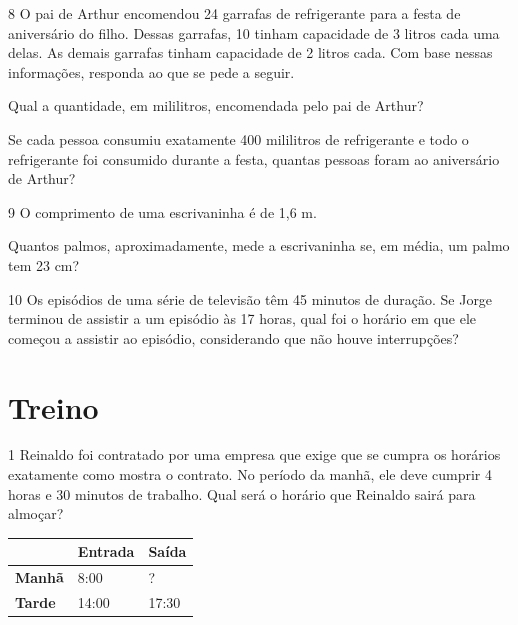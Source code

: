 \num{8} O pai de Arthur encomendou 24 garrafas de
refrigerante para a festa de aniversário do filho. Dessas garrafas, 10 tinham capacidade de 3 litros cada uma delas. As demais garrafas tinham capacidade de 2 litros cada. Com base nessas
informações, responda ao que se pede a seguir.

\begin{escolha}
\item Qual a quantidade, em mililitros, encomendada pelo pai de Arthur?

\item Se cada pessoa consumiu exatamente 400 mililitros de refrigerante e
  todo o refrigerante foi consumido durante a festa, quantas pessoas
  foram ao aniversário de Arthur?
\end{escolha}

\num{9} O comprimento de uma escrivaninha é de 1,6 m. 

\begin{escolha}
\item Quantos palmos,
aproximadamente, mede a escrivaninha se, em média, um palmo tem 23 cm?
\end{escolha}

\num{10} Os episódios de uma série de televisão têm 45 minutos de duração.
Se Jorge terminou de assistir a um episódio às 17 horas, qual foi o
horário em que ele começou a assistir ao episódio, considerando que não houve interrupções?
 
\pagebreak
\section*{Treino}

\num{1} Reinaldo foi contratado por uma empresa que exige que se cumpra os horários exatamente como mostra o contrato. No período da manhã, ele deve
cumprir 4 horas e 30 minutos de trabalho. Qual será o horário que
Reinaldo sairá para almoçar?

\begin{longtable}[]{@{}lll@{}}
\toprule
& \textbf{Entrada} & \textbf{Saída}\tabularnewline
\midrule
\endhead
\hline
\textbf{Manhã} & 8:00 & ?\tabularnewline
\hline
\textbf{Tarde} & 14:00 & 17:30\tabularnewline
\hline
\bottomrule
\end{longtable}

